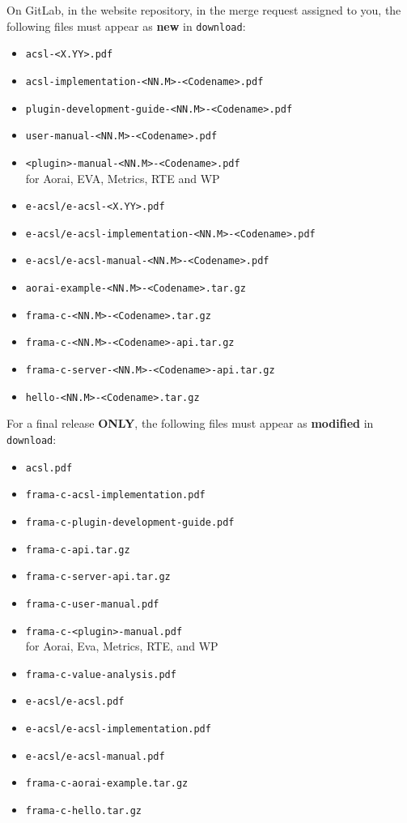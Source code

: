 On GitLab, in the website repository, in the merge request assigned to you, the
following files must appear as \textbf{new} in \texttt{download}:
\begin{itemize}
  \item \texttt{acsl-<X.YY>.pdf}
  \item \texttt{acsl-implementation-<NN.M>-<Codename>.pdf}
  \item \texttt{plugin-development-guide-<NN.M>-<Codename>.pdf}
  \item \texttt{user-manual-<NN.M>-<Codename>.pdf}
  \item \texttt{<plugin>-manual-<NN.M>-<Codename>.pdf}\\
        for Aorai, EVA, Metrics, RTE and WP
  \item \texttt{e-acsl/e-acsl-<X.YY>.pdf}
  \item \texttt{e-acsl/e-acsl-implementation-<NN.M>-<Codename>.pdf}
  \item \texttt{e-acsl/e-acsl-manual-<NN.M>-<Codename>.pdf}
  \item \texttt{aorai-example-<NN.M>-<Codename>.tar.gz}
  \item \texttt{frama-c-<NN.M>-<Codename>.tar.gz}
  \item \texttt{frama-c-<NN.M>-<Codename>-api.tar.gz}
  \item \texttt{frama-c-server-<NN.M>-<Codename>-api.tar.gz}
  \item \texttt{hello-<NN.M>-<Codename>.tar.gz}
\end{itemize}

For a final release \textbf{ONLY}, the following files must appear as \textbf{modified} in \texttt{download}:

\begin{itemize}
  \item \texttt{acsl.pdf}
  \item \texttt{frama-c-acsl-implementation.pdf}
  \item \texttt{frama-c-plugin-development-guide.pdf}
  \item \texttt{frama-c-api.tar.gz}
  \item \texttt{frama-c-server-api.tar.gz}
  \item \texttt{frama-c-user-manual.pdf}
  \item \texttt{frama-c-<plugin>-manual.pdf}\\
        for Aorai, Eva, Metrics, RTE, and WP
  \item \texttt{frama-c-value-analysis.pdf}
  \item \texttt{e-acsl/e-acsl.pdf}
  \item \texttt{e-acsl/e-acsl-implementation.pdf}
  \item \texttt{e-acsl/e-acsl-manual.pdf}
  \item \texttt{frama-c-aorai-example.tar.gz}
  \item \texttt{frama-c-hello.tar.gz}
\end{itemize}

